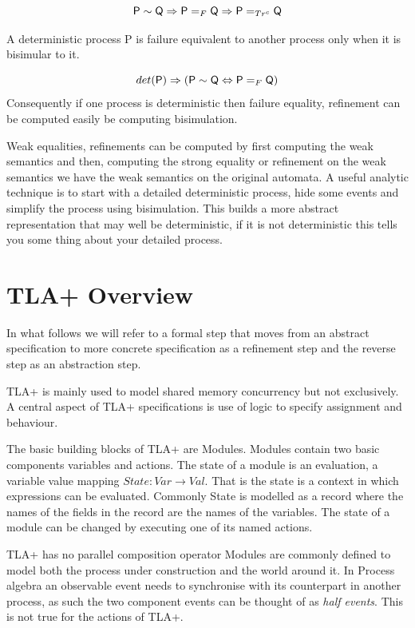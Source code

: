 \documentclass[]{article}
\begin{document}
 \[{\sf P}\sim {\sf Q} \Rightarrow {\sf P}=_F {\sf Q} \Rightarrow {\sf P}=_{Tr^c} {\sf Q} \]

\noindent  A deterministic process {\sf P} is failure equivalent to another process only when it is bisimular to it.

 \[det({\sf P}) \Rightarrow ({\sf P}\sim {\sf Q} \Leftrightarrow {\sf P}=_F {\sf Q} ) \]
Consequently if one process is deterministic then failure equality, refinement can be computed easily be computing bisimulation.

Weak equalities, refinements  can be computed  by first computing the weak semantics and then, computing the strong equality or  refinement
 on the weak semantics we have the weak semantics on the original automata. A useful analytic technique is to  start with a detailed deterministic process,  hide some events and simplify the process using bisimulation.   This builds a more abstract representation that may well be deterministic, if it is not deterministic this tells you some thing about your detailed process.




\section{TLA+  Overview}
In what follows we will refer to a formal step that moves from an abstract specification to  more concrete specification  as a refinement step and the reverse step as an abstraction step.

TLA+ is mainly used to model shared memory concurrency but not exclusively. A central aspect of TLA+ specifications is use of logic to specify assignment and behaviour.

The basic building blocks of TLA+ are  Modules. Modules contain two basic components variables and actions. The state of a module is an evaluation, a variable value mapping $State:Var\rightarrow Val$. That is the state is a context in which expressions can be evaluated. Commonly State is modelled as a record where the names of the fields in the record are the names of the variables. The state of a module can be changed by executing one of its named actions.

TLA+ has no parallel composition operator Modules are commonly defined to model both the process under construction and the world around it.  In Process algebra an observable event needs to synchronise with its counterpart in another process, as such the two component events can be thought of as \emph{half events}. This is not true for the actions of  TLA+.
\end{document}
